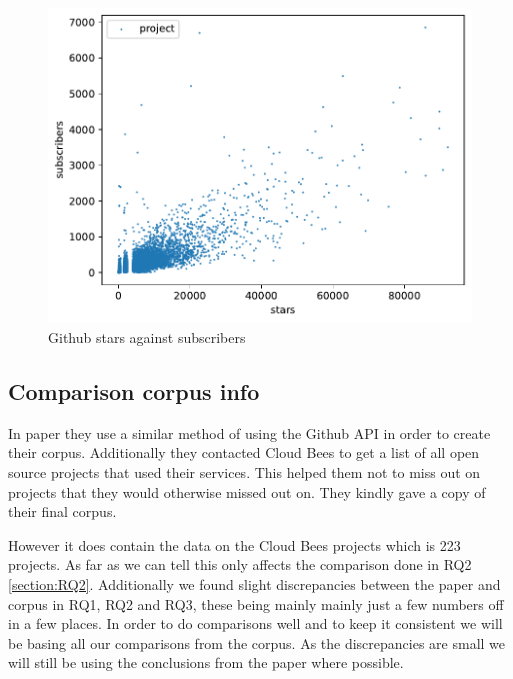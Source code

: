 \documentclass[10pt,conference]{IEEEtran}
\begin{document}
\begin{figure}[!htbp]
  \centering
  \includegraphics[width=\textwidth]{../src/results/sub vs stars.pdf}
  \caption[alt text]{Github stars against subscribers}
  \label{graph_scatter_stars_vs_subs}
\end{figure}

\vspace*{-0.05in}
\subsection{Comparison corpus info}
\label{section:HiltonComaprisonCoprusTHing}
\vspace*{-0.05in}
In \citet{Hilton2016} paper they use a similar method of using the Github API in order to create their corpus. Additionally they contacted Cloud Bees \citet{CloudBees2020} to get a list of all open source projects that used their services. This helped them not to miss out on projects that they would otherwise missed out on. They kindly gave a copy of their final corpus. 

However it does contain the data on the Cloud Bees projects which is 223 projects. As far as we can tell this only affects the comparison done in RQ2 \ref{section:RQ2}. Additionally we found slight discrepancies between the paper and corpus in RQ1, RQ2 and RQ3, these being mainly mainly just a few numbers off in a few places. In order to do comparisons well and to keep it consistent we will be basing all our comparisons from the corpus. As the discrepancies are small we will still be using the conclusions from the paper where possible.  
\end{document}
